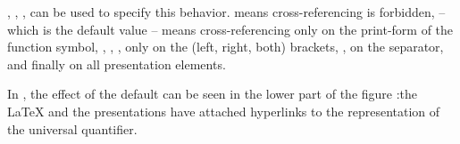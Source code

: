 \begin{description}
  {},
  {},
  {}
  {}, can be used to specify this
  behavior.  {} means cross-referencing
  is forbidden, {} -- which is the
  default value -- means cross-referencing only on the print-form of the function
  symbol, {},
  {},
  {}, only on the (left, right,
  both) brackets, {}, on the
  separator, and finally {} on all
  presentation elements.
  
  In {}, the effect of the default
  {} can be seen in the lower part of
  the figure :the {\LaTeX} and the {\html} presentations have attached hyperlinks
  to the representation of the universal quantifier.
\end{description}
